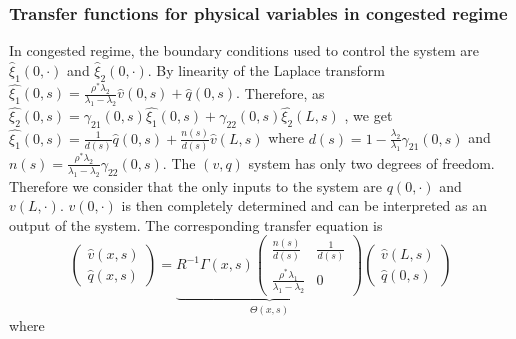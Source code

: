 \documentclass[a4paper, 10pt, conference]{ieeeconf}      %
\begin{document}
\subsubsection{Transfer functions for physical variables in congested regime}
In congested regime, the boundary conditions used to control the system are $\hat{\xi}_{1}\left(0,\cdot\right)$ and $\hat{\xi}_{2}\left(0,\cdot\right)$. By linearity of the Laplace transform
{\footnotesize
$\hat{\xi_{1}}\left(0,s\right) = 
\frac{
	\rho^{*}\lambda_{2}
}{
	\lambda_{1} - \lambda_{2}
} 
\hat{v}\left(0,s\right)
+
\hat{q}\left(0,s\right)
$.}
Therefore, as
{\footnotesize
$\hat{\xi_{2}}\left(0,s\right) =
\gamma_{21}\left(0,s\right)
\hat{\xi_{1}}\left(0,s\right)
+
\gamma_{22}\left(0,s\right)
\hat{\xi_{2}}\left(L,s\right)$}
, we get
{\footnotesize
$\hat{\xi_{1}}\left(0,s\right) =
\frac{1}{d\left(s\right)}
\hat{q}\left(0,s\right)
+
\frac{n\left(s\right)}{d\left(s\right)}
\hat{v}\left(L,s\right)
$}
where
{\footnotesize
$d\left(s\right) = 1 - \frac{\lambda_{2}}{\lambda_{1}}\gamma_{21}\left(0,s\right)$}
and
{\footnotesize$n\left(s\right) = \frac{\rho^{*} \lambda_{2}}{\lambda_{1} - \lambda_{2}} \gamma_{22}\left(0,s\right)$}. The {\footnotesize$\left(v,q\right)$} system has only two degrees of freedom. Therefore we consider that the only inputs to the system are {\footnotesize$q\left(0,\cdot\right)$} and {\footnotesize$v\left(L,\cdot\right)$}. {\footnotesize$v\left(0,\cdot\right)$} is then completely determined and can be interpreted as an output of the system. The corresponding transfer equation is
{\footnotesize
\begin{equation}
\begin{pmatrix}
	\hat{v}\left(x,s\right)
	\\
	\hat{q}\left(x,s\right)
\end{pmatrix}
=
\underset{\Theta\left(x,s\right)}{
\underbrace{
R^{-1}\Gamma\left(x,s\right)
\begin{pmatrix}
	\frac{n\left(s\right)}{d\left(s\right)}
		&
	\frac{1}{d\left(s\right)}	
	\\
	\frac{\rho^{*}\lambda_{1}}{\lambda_{1} - \lambda_{2}}
		&
	0
\end{pmatrix}
}
}
\begin{pmatrix}
	\hat{v}\left(L,s\right)
	\\
	\hat{q}\left(0,s\right)
\end{pmatrix}
\end{equation}
}
where
\end{document}
